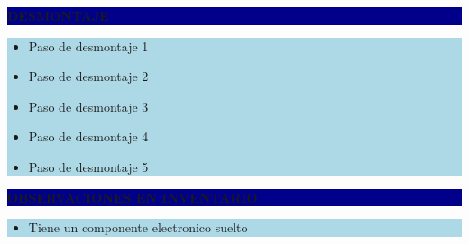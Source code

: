 \documentclass[11pt]{article}
\newcommand{\seccionbanda}[1]{%
  \vspace{0.6em}
  \noindent\colorbox{darkblue}{\parbox{\dimexpr\linewidth-2\fboxsep}{%
    \centering\color{white}\bfseries #1}}\par\vspace{0.6em}
}
\begin{document}
\seccionbanda{DESMONTAJE}
\noindent\colorbox{lightblue}{\parbox{\dimexpr\linewidth-2\fboxsep\relax}{%
\begin{itemize}[label=$\square$, itemsep=4pt]
\item Paso de desmontaje 1
\item Paso de desmontaje 2
\item Paso de desmontaje 3
\item Paso de desmontaje 4
\item Paso de desmontaje 5
\end{itemize}
}}\par
\seccionbanda{OBSERVACIONES EN INVENTARIO}
\noindent\colorbox{lightblue}{\parbox{\dimexpr\linewidth-2\fboxsep\relax}{\begin{itemize}[itemsep=4pt]
\item Tiene un componente electronico suelto
\end{itemize}}}\par
\end{document}
